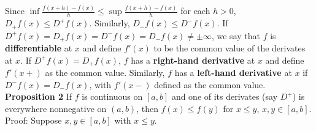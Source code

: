 \documentclass[a4paper]{article}
\begin{document}
Since $\inf \frac{f(x+h) - f(x)}{h} \leq \sup \frac{f(x+h) - f(x)}{h}$ for each $h > 0$, $D_+ f(x) \leq D^+ f(x)$. Similarly, $D_- f(x) \leq D^- f(x)$. If $D^+ f(x) = D_+ f(x) = D^- f(x) = D_- f(x) \neq \pm \infty$, we say that $f$ is {\bf differentiable} at $x$ and define $f'(x)$ to be the common value of the derivates at $x$. If $D^+ f(x) = D_+ f(x)$, $f$ has a {\bf right-hand derivative} at $x$ and define $f'(x+)$ as the common value. Similarly, $f$ has a {\bf left-hand derivative} at $x$ if $D^- f(x) = D_- f(x)$, with $f'(x-)$ defined as the common value.\\

{\bf Proposition 2} If $f$ is continuous on $[a,b]$ and one of its derivates (say $D^+$) is everywhere nonnegative on $(a,b)$, then $f(x) \leq f(y)$ for $x \leq y$, $x,y \in [a,b]$. \\

Proof: Suppose $x,y \in [a,b]$ with $x\leq y$. 
\end{document}
